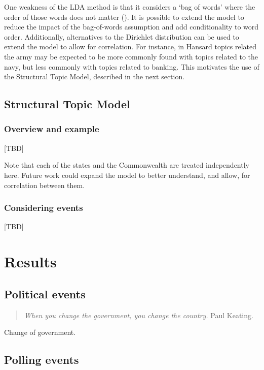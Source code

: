 \documentclass[12pt,]{article}
\theoremstyle{definition}
\theoremstyle{definition}
\theoremstyle{definition}
\theoremstyle{remark}
\begin{document}
One weakness of the LDA method is that it considers a `bag of words'
where the order of those words does not matter (\citet{blei2012}). It is
possible to extend the model to reduce the impact of the bag-of-words
assumption and add conditionality to word order. Additionally,
alternatives to the Dirichlet distribution can be used to extend the
model to allow for correlation. For instance, in Hansard topics related
the army may be expected to be more commonly found with topics related
to the navy, but less commonly with topics related to banking. This
motivates the use of the Structural Topic Model, described in the next
section.

\subsection{Structural Topic Model}\label{structural-topic-model}

\subsubsection{Overview and example}\label{overview-and-example}

{[}TBD{]}

Note that each of the states and the Commonwealth are treated
independently here. Future work could expand the model to better
understand, and allow, for correlation between them.

\subsubsection{Considering events}\label{considering-events}

{[}TBD{]}

\section{Results}\label{results}

\subsection{Political events}\label{political-events}

\begin{quote}
\emph{When you change the government, you change the country.} Paul
Keating.
\end{quote}

Change of government.

\subsection{Polling events}\label{polling-events}
\end{document}
